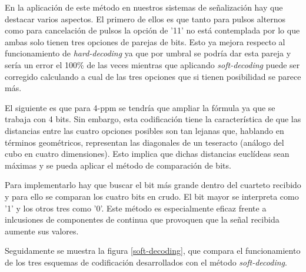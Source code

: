 
En la aplicación de este método en nuestros sistemas de señalización hay que destacar 
varios aspectos. El primero de ellos es que
tanto para pulsos alternos como para cancelación de pulsos la opción de 
'11' no está contemplada por lo que ambas solo tienen tres opciones de parejas de bits. 
Esto ya mejora respecto al funcionamiento de \textit{hard-decoding} ya que por umbral se 
podría dar esta pareja y sería un error el 100\% de las veces mientras que aplicando 
\textit{soft-decoding} puede ser corregido calculando a cual de las tres opciones 
que si tienen posibilidad se parece más.

El siguiente es que para 4-ppm se tendría que ampliar la fórmula ya que se trabaja
con 4 bits. Sin embargo, esta codificación tiene la característica de que las distancias
entre las cuatro opciones posibles son tan lejanas que,
hablando en términos geométricos, representan las diagonales
de un teseracto (análogo del cubo en cuatro dimensiones). Esto implica que dichas 
distancias euclídeas sean máximas y se pueda aplicar el método de comparación de bits.

Para implementarlo hay que buscar el bit más grande dentro del cuarteto
recibido y para ello se comparan los cuatro bits en crudo. El bit mayor se interpreta 
como '1' y los otros tres como '0'. Este método es especialmente eficaz frente a 
inlcusiones de componentes de continua que provoquen que la señal recibida aumente sus 
valores.

Seguidamente se muestra la figura \ref{soft-decoding}, que compara el funcionamiento de 
los tres esquemas de codificación desarrollados con el método \textit{soft-decoding}.

